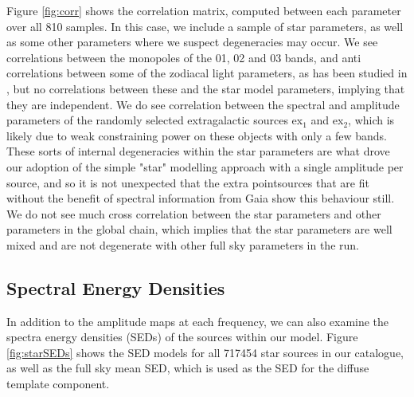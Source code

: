 \documentclass{aa}
\begin{document}
Figure \ref{fig:corr} shows the correlation matrix, computed between each parameter over all 810 samples. In this case, we include a sample of star parameters, as well as some other parameters where we suspect degeneracies may occur. We see correlations between the monopoles of the 01, 02 and 03 bands, and anti correlations between some of the zodiacal light parameters, as has been studied in \citep{CG02_01, CG02_02}, but no correlations between these and the star model parameters, implying that they are independent. We do see correlation between the spectral and amplitude parameters of the randomly selected extragalactic sources ex$_1$ and ex$_2$, which is likely due to weak constraining power on these objects with only a few bands. These sorts of internal degeneracies within the star parameters are what drove our adoption of the simple "star" modelling approach with a single amplitude per source, and so it is not unexpected that the extra pointsources that are fit without the benefit of spectral information from Gaia show this behaviour still. We do not see much cross correlation between the star parameters and other parameters in the global chain, which implies that the star parameters are well mixed and are not degenerate with other full sky parameters in the run.

\subsection{Spectral Energy Densities}

In addition to the amplitude maps at each frequency, we can also examine the spectra energy densities (SEDs) of the sources within our model. Figure \ref{fig:starSEDs} shows the SED models for all 717454 star sources in our catalogue, as well as the full sky mean SED, which is used as the SED for the diffuse template component. 
\end{document}
